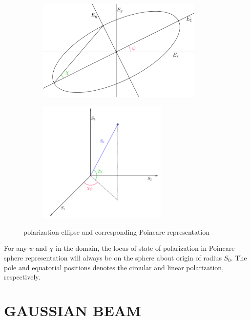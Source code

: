 \documentclass[11pt,a4paper]{article}
\numberwithin{equation}{section}
\begin{document}
\begin{figure}[H]
	\begin{subfigure}[H]{0.48\textwidth}
		\centering
		\includegraphics[width=0.9\textwidth]{ellipse_new}
		\caption{}
	\end{subfigure}
	\hfill
	\begin{subfigure}[H]{0.48\textwidth}
		\centering
		\includegraphics[width=0.7\textwidth]{poincare}
		\caption{}
	\end{subfigure}
	\caption{polarization ellipse and corresponding Poincare representation}
	\label{fig:compare poincare}
\end{figure}
For any $\psi$ and $\chi$ in the domain, the locus of state of polarization in Poincare sphere representation will always be on the sphere about origin of radius $S_0$. The pole and equatorial positions denotes the circular and linear polarization, respectively.
\clearpage



\section{GAUSSIAN BEAM}
\end{document}
